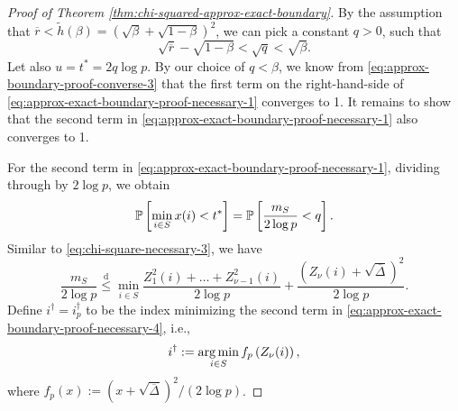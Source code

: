 \begin{proof}[Proof of Theorem \ref{thm:chi-squared-approx-exact-boundary}]
By the assumption that $\overline{r}<\widetilde{h}(\beta)=(\sqrt{\beta}+\sqrt{1-\beta})^2$, we can pick a constant $q>0$, such that 
\begin{equation} \label{eq:approx-exact-boundary-proof-necessary-2}
    \sqrt{\overline{r}} - \sqrt{1-\beta} < \sqrt{q} < \sqrt{\beta}.
\end{equation}
Let also $u = t^*=2q\log{p}$.
By our choice of $q < \beta$, we know from \eqref{eq:approx-boundary-proof-converse-3} that the first term on the right-hand-side of \eqref{eq:approx-exact-boundary-proof-necessary-1} converges to 1.
It remains to show that the second term in \eqref{eq:approx-exact-boundary-proof-necessary-1} also converges to 1.

For the second term in \eqref{eq:approx-exact-boundary-proof-necessary-1}, dividing through by $2\log{p}$, we obtain
\begin{equation} \label{eq:approx-exact-boundary-proof-necessary-3}
    \P\left[\min_{i\in S}x(i)<t^*\right] = \P\left[ \frac{m_{S}}{2\log{p}} < q \right].
\end{equation}
Similar to \eqref{eq:chi-square-necessary-3}, we have
\begin{equation} \label{eq:approx-exact-boundary-proof-necessary-4}
    \frac{m_{S}}{2\log{p}} 
    \stackrel{\mathrm{d}}{\le} \min_{i\in S}\frac{Z_1^2(i) + \ldots + Z_{\nu-1}^2(i)}{2\log{p}} + \frac{(Z_\nu(i) + \sqrt{\overline{\Delta}})^2}{2\log{p}}.
\end{equation}
Define $i^\dagger = i^\dagger_p$ to be the index minimizing the second term in \eqref{eq:approx-exact-boundary-proof-necessary-4}, i.e.,
\begin{equation}
    i^\dagger := \argmin_{i\in S} f_p\left(Z_\nu(i)\right),
\end{equation}
where $f_p(x):=(x+\sqrt{\overline{\Delta}})^2/(2\log{p})$. 


\end{proof}
